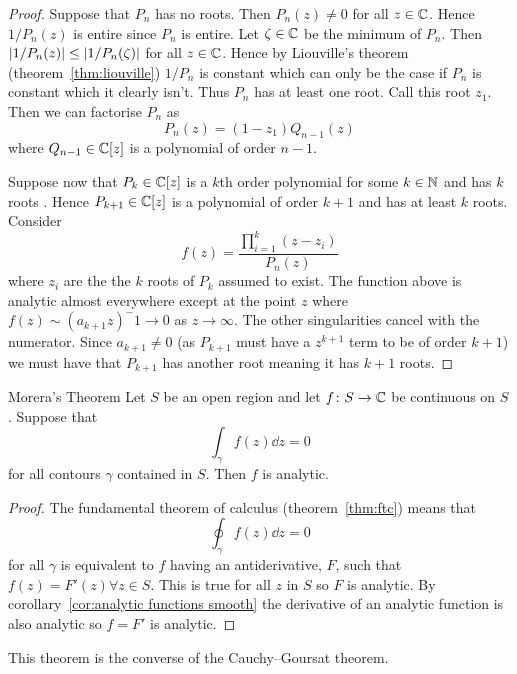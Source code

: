 \documentclass{article}
\begin{document}
    \begin{proof}
        Suppose that \(P_n\) has no roots.
        Then \(P_n(z)\ne 0\) for all \(z\in\mathbb{C}\).
        Hence \(1/P_n(z)\) is entire since \(P_n\) is entire.
        Let \(\zeta\in\mathbb{C}\) be the minimum of \(P_n\).
        Then \(\abs{1/P_n(z)} \le \abs{1/P_n(\zeta)}\) for all \(z\in\mathbb{C}\).
        Hence by Liouville's theorem (theorem~\ref{thm:liouville}) \(1/P_n\) is constant which can only be the case if \(P_n\) is constant which it clearly isn't.
        Thus \(P_n\) has at least one root.
        Call this root \(z_1\).
        Then we can factorise \(P_n\) as
        \[P_n(z) = (1 - z_1)Q_{n-1}(z)\]
        where \(Q_{n-1}\in\mathbb{C}[z]\) is a polynomial of order \(n-1\).
        
        Suppose now that \(P_{k}\in\mathbb{C}[z]\) is a \(k\)th order polynomial for some \(k\in\mathbb{N}\) and has \(k\) roots .
        Hence \(P_{k+1}\in\mathbb{C}[z]\) is a polynomial of order \(k+1\) and has at least \(k\) roots.
        Consider
        \[f(z) = \frac{\prod_{i=1}^{k}(z - z_i)}{P_n(z)}\]
        where \(z_i\) are the the \(k\) roots of \(P_k\) assumed to exist.
        The function above is analytic almost everywhere except at the point \(z\) where \(f(z) \sim (a_{k+1}z)^-1\to 0\) as \(z\to\infty\).
        The other singularities cancel with the numerator.
        Since \(a_{k+1}\ne 0\) (as \(P_{k+1}\) must have a \(z^{k+1}\) term to be of order \(k + 1\)) we must have that \(P_{k+1}\) has another root meaning it has \(k + 1\) roots.
    \end{proof}
    
    \begin{theorem}{Morera's Theorem}{}
        Let \(S\) be an open region and let \(f\colon S\to\mathbb{C}\) be continuous on \(S\).
        Suppose that
        \[\int_\gamma f(z) \dd{z} = 0\]
        for all contours \(\gamma\) contained in \(S\).
        Then \(f\) is analytic.
    \end{theorem}
    \begin{proof}
        The fundamental theorem of calculus (theorem~\ref{thm:ftc}) means that
        \[\oint_\gamma f(z)\dd{z} = 0\]
        for all \(\gamma\) is equivalent to \(f\) having an antiderivative, \(F\), such that \(f(z) = F'(z)\forall z\in S\).
        This is true for all \(z\) in \(S\) so \(F\) is analytic.
        By corollary~\ref{cor:analytic functions smooth} the derivative of an analytic function is also analytic so \(f = F'\) is analytic.
    \end{proof}
    This theorem is the converse of the Cauchy--Goursat theorem.
    
\end{document}

